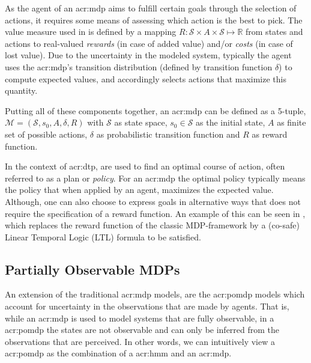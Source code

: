 As the agent of an \acrshort{acr:mdp} aims to fulfill certain goals through the selection of actions, it requires some means of assessing which action is the best to pick.
The value measure used in  is defined by a mapping $R: \mathcal{S} \times A \times \mathcal{S} \mapsto \mathbb{R}$ from states and actions to real-valued \textit{rewards} (in case of added value) and/or \textit{costs} (in case of lost value).
Due to the uncertainty in the modeled system, typically the agent uses the \acrshort{acr:mdp}'s transition distribution (defined by transition function $\delta$) to compute expected values, and accordingly selects actions that maximize this quantity.

Putting all of these components together, an \acrshort{acr:mdp} can be defined as a 5-tuple, $\mathcal{M} = (\mathcal{S}, s_0, A, \delta, R)$ with $\mathcal{S}$ as state space, $s_0 \in \mathcal{S}$ as the initial state, $A$ as finite set of possible actions, $\delta$ as probabilistic transition function and $R$ as reward function.

In the context of \acrshort{acr:dtp},  are used to find an optimal course of action, often referred to as a plan or \textit{policy}.
For an \acrshort{acr:mdp} the optimal policy typically means the policy that when applied by an agent, maximizes the expected value.
Although, one can also choose to express goals in alternative ways that does not require the specification of a reward function.
An example of this can be seen in \cite{bhatia2010sampling, lacerda2015optimal}, which replaces the reward function of the classic MDP-framework by a (co-safe) Linear Temporal Logic (LTL) formula to be satisfied.

\subsection{Partially Observable MDPs}
\label{subsec:pomdps}


An extension of the traditional \acrshort{acr:mdp} models, are the \acrfull{acr:pomdp} models which account for uncertainty in the observations that are made by agents.
That is, while an \acrshort{acr:mdp} is used to model systems that are fully observable, in a \acrshort{acr:pomdp} the states are not observable and can only be inferred from the observations that are perceived.
In other words, we can intuitively view a \acrshort{acr:pomdp} as the combination of a \acrshort{acr:hmm} and an \acrshort{acr:mdp}.

